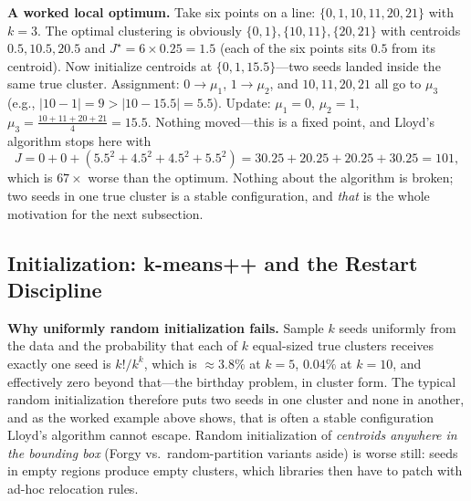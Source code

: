 \textbf{A worked local optimum.} Take six points on a line: $\{0, 1, 10, 11, 20, 21\}$ with $k = 3$. The optimal clustering is obviously $\{0,1\}, \{10,11\}, \{20,21\}$ with centroids $0.5, 10.5, 20.5$ and $J^\star = 6 \times 0.25 = 1.5$ (each of the six points sits $0.5$ from its centroid). Now initialize centroids at $\{0, 1, 15.5\}$---two seeds landed inside the same true cluster. Assignment: $0 \to \mu_1$, $1 \to \mu_2$, and $10, 11, 20, 21$ all go to $\mu_3$ (e.g., $|10 - 1| = 9 > |10 - 15.5| = 5.5$). Update: $\mu_1 = 0$, $\mu_2 = 1$, $\mu_3 = \frac{10+11+20+21}{4} = 15.5$. Nothing moved---this is a fixed point, and Lloyd's algorithm stops here with
\begin{equation*}
J = 0 + 0 + (5.5^2 + 4.5^2 + 4.5^2 + 5.5^2) = 30.25 + 20.25 + 20.25 + 30.25 = 101,
\end{equation*}
which is $67\times$ worse than the optimum. Nothing about the algorithm is broken; two seeds in one true cluster is a stable configuration, and \emph{that} is the whole motivation for the next subsection.

\subsection{Initialization: k-means++ and the Restart Discipline}
\label{cml:sec:kmeanspp}

\textbf{Why uniformly random initialization fails.} Sample $k$ seeds uniformly from the data and the probability that each of $k$ equal-sized true clusters receives exactly one seed is $k!/k^k$, which is $\approx 3.8\%$ at $k=5$, $0.04\%$ at $k=10$, and effectively zero beyond that---the birthday problem, in cluster form. The typical random initialization therefore puts two seeds in one cluster and none in another, and as the worked example above shows, that is often a stable configuration Lloyd's algorithm cannot escape. Random initialization of \emph{centroids anywhere in the bounding box} (Forgy vs.\ random-partition variants aside) is worse still: seeds in empty regions produce empty clusters, which libraries then have to patch with ad-hoc relocation rules.

